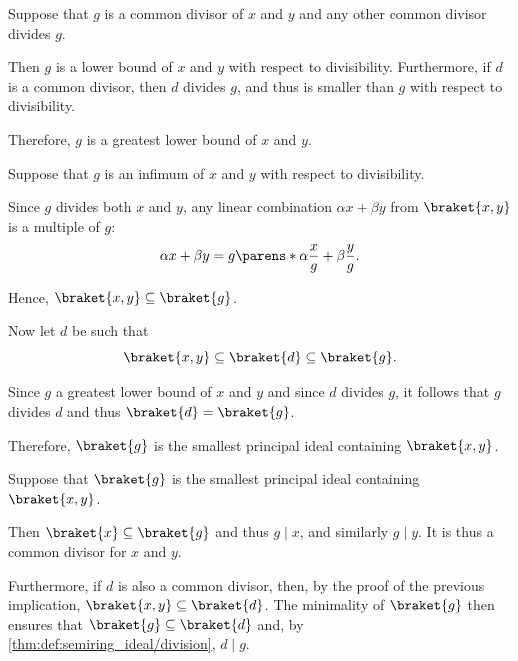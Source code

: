 \begin{defproof}
   Suppose that \( g \) is a common divisor of \( x \) and \( y \) and any other common divisor divides \( g \).

  Then \( g \) is a lower bound of \( x \) and \( y \) with respect to divisibility. Furthermore, if \( d \) is a common divisor, then \( d \) divides \( g \), and thus is smaller than \( g \) with respect to divisibility.

  Therefore, \( g \) is a greatest lower bound of \( x \) and \( y \).

   Suppose that \( g \) is an infimum of \( x \) and \( y \) with respect to divisibility.

  Since \( g \) divides both \( x \) and \( y \), any linear combination \( \alpha x + \beta y \) from \( \braket{ x, y } \) is a multiple of \( g \):
  \begin{equation*}
    \alpha x + \beta y
    =
    g \parens*{ \alpha \frac x g + \beta \frac y g }.
  \end{equation*}

  Hence, \( \braket{ x, y } \subseteq \braket{ g } \).

  Now let \( d \) be such that
  \begin{equation*}
    \braket{ x, y } \subseteq \braket{ d } \subseteq \braket{ g }.
  \end{equation*}

  Since \( g \) a greatest lower bound of \( x \) and \( y \) and since \( d \) divides \( g \), it follows that \( g \) divides \( d \) and thus \( \braket{ d } = \braket{ g } \).

  Therefore, \( \braket{ g } \) is the smallest principal ideal containing \( \braket{ x, y } \).

   Suppose that \( \braket{ g } \) is the smallest principal ideal containing \( \braket{ x, y } \).

  Then \( \braket{ x } \subseteq \braket{ g } \) and thus \( g \mid x \), and similarly \( g \mid y \). It is thus a common divisor for \( x \) and \( y \).

  Furthermore, if \( d \) is also a common divisor, then, by the proof of the previous implication, \( \braket{ x, y } \subseteq \braket{ d } \). The minimality of \( \braket{ g } \) then ensures that \( \braket{ g } \subseteq \braket{ d } \) and, by \cref{thm:def:semiring_ideal/division}, \( d \mid g \).
\end{defproof}

